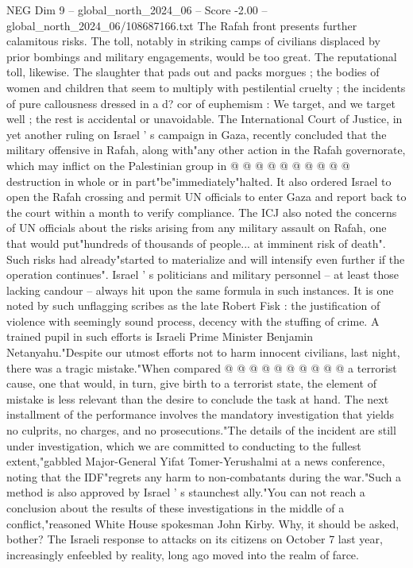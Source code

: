 \begin{textsample}{NEG Dim 9 – global\_north\_2024\_06 – Score -2.00 – global\_north\_2024\_06/108687166.txt}
The Rafah front presents further calamitous risks.
The toll, notably in striking camps of civilians displaced by prior bombings and military engagements, would be too great.
The reputational toll, likewise.
The slaughter that pads out and packs morgues ; the bodies of women and children that seem to multiply with pestilential cruelty ; the incidents of pure callousness dressed in a d? cor of euphemism : We target, and we target well ; the rest is accidental or unavoidable.
The International Court of Justice, in yet another ruling on Israel ' s campaign in Gaza, recently concluded that the military offensive in Rafah, along with"any other action in the Rafah governorate, which may inflict on the Palestinian group in @ @ @ @ @ @ @ @ @ @ destruction in whole or in part"be"immediately"halted.
It also ordered Israel to open the Rafah crossing and permit UN officials to enter Gaza and report back to the court within a month to verify compliance.
The ICJ also noted the concerns of UN officials about the risks arising from any military assault on Rafah, one that would put"hundreds of thousands of people... at imminent risk of death".
Such risks had already"started to materialize and will intensify even further if the operation continues".
Israel ' s politicians and military personnel -- at least those lacking candour -- always hit upon the same formula in such instances.
It is one noted by such unflagging scribes as the late Robert Fisk : the justification of violence with seemingly sound process, decency with the stuffing of crime.
A trained pupil in such efforts is Israeli Prime Minister Benjamin Netanyahu."Despite our utmost efforts not to harm innocent civilians, last night, there was a tragic mistake."When compared @ @ @ @ @ @ @ @ @ @ a terrorist cause, one that would, in turn, give birth to a terrorist state, the element of mistake is less relevant than the desire to conclude the task at hand.
The next installment of the performance involves the mandatory investigation that yields no culprits, no charges, and no prosecutions."The details of the incident are still under investigation, which we are committed to conducting to the fullest extent,"gabbled Major-General Yifat Tomer-Yerushalmi at a news conference, noting that the IDF"regrets any harm to non-combatants during the war."Such a method is also approved by Israel ' s staunchest ally."You can not reach a conclusion about the results of these investigations in the middle of a conflict,"reasoned White House spokesman John Kirby.
Why, it should be asked, bother?
The Israeli response to attacks on its citizens on October 7 last year, increasingly enfeebled by reality, long ago moved into the realm of farce.

\end{textsample}
